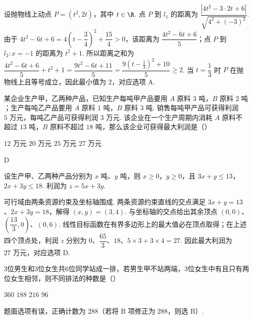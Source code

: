 \begin{solution}
设抛物线上动点 \(P=(t^2,2t)\)，其中 \(t\in\R\). 点 \(P\) 到 \(l_1\) 的距离为 \(\dfrac{|4t^2-3\cdot2t+6|}{\sqrt{4^2+(-3)^2}}\). 由于 \(4t^2-6t+6=4\left(t-\dfrac34\right)^2+\dfrac{15}{4}>0\)，该距离为 \(\dfrac{4t^2-6t+6}{5}\)；点 \(P\) 到 \(l_2:x=-1\) 的距离为 \(t^2+1\). 所以距离之和为 \(\dfrac{4t^2-6t+6}{5}+t^2+1=\dfrac{9t^2-6t+11}{5}=\dfrac{9\left(t-\frac13\right)^2+10}{5}\geqslant2\). 当 \(t=\dfrac13\) 时 \(P\) 在抛物线上且等号成立，因此最小值为 \(2\)，对应选项 A.
\end{solution}

\begin{problem}
某企业生产甲，乙两种产品，已知生产每吨甲产品要用 \(A\) 原料 \(3\text{ 吨}\)，\(B\) 原料 \(2\text{ 吨}\)；生产每吨乙产品要用 \(A\) 原料 \(1\text{ 吨}\)，\(B\) 原料 \(3\text{ 吨}\). 销售每吨甲产品可获得利润 \(5\text{ 万元}\)，每吨乙产品可获得利润 \(3\text{ 万元}\). 该企业在一个生产周期内消耗 \(A\) 原料不超过 \(13\text{ 吨}\)，\(B\) 原料不超过 \(18\text{ 吨}\)，那么该企业可获得最大利润是（\quad）

\choices
    {\(12\text{ 万元}\)}
    {\(20\text{ 万元}\)}
    {\(25\text{ 万元}\)}
    {\(27\text{ 万元}\)}
\end{problem}

\begin{answer}
D
\end{answer}

\begin{solution}
设生产甲、乙两种产品分别为 \(x\text{ 吨}\)、\(y\text{ 吨}\)，则 \(x\geqslant0\)，\(y\geqslant0\)，且 \(3x+y\leqslant13\)，\(2x+3y\leqslant18\). 利润为 \(z=5x+3y\).

可行域由两条资源约束及坐标轴围成. 两条资源约束直线的交点满足 \(3x+y=13\)、\(2x+3y=18\)，解得 \((x,y)=(3,4)\). 与坐标轴的交点给出其余顶点 \((0,0)\)、\(\left(\dfrac{13}{3},0\right)\)、\((0,6)\). 线性目标函数在有界多边形上的最大值必在顶点取得；在上述四个顶点处，利润 \(z\) 分别为 \(0\)、\(\dfrac{65}{3}\)、\(18\)、\(5\times3+3\times4=27\). 因此最大利润为 \(27\text{ 万元}\)，对应选项 D.
\end{solution}

\begin{problem}
3位男生和3位女生共6位同学站成一排，若男生甲不站两端，3位女生中有且只有两位女生相邻，则不同排法的种数是（\quad）

\choices
    {\(360\)}
    {\(188\)}
    {\(216\)}
    {\(96\)}
\end{problem}

\begin{answer}
题面选项有误，正确计数为 \(288\)（若将 B 项修正为 \(288\)，则选 B）.
\end{answer}

